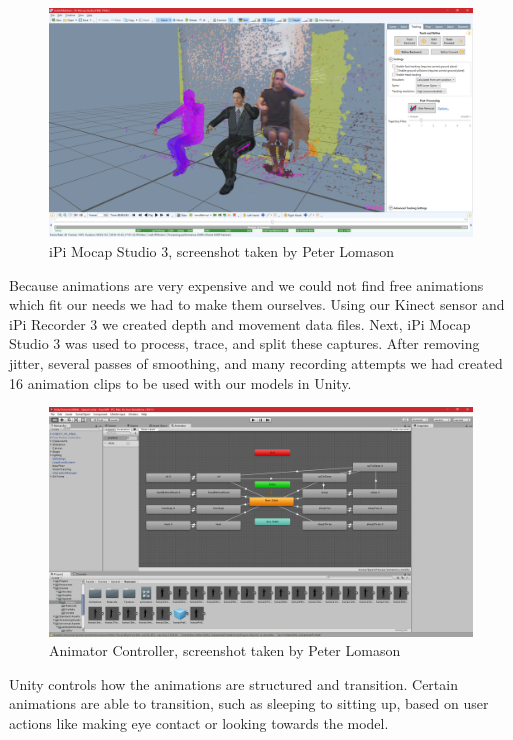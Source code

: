 \documentclass[a4paper,10pt]{article}
\begin{document}
\par
\begin{figure}[H] %
	\centerline {\includegraphics[scale = 0.28]{motionCapture.png}}
	\caption{iPi Mocap Studio 3, screenshot taken by Peter Lomason}
	\label{fig:motionCapture}
\end{figure}
Because animations are very expensive and we could not find free animations which fit our needs we had to make them ourselves. Using our Kinect sensor and iPi Recorder 3 we created depth and movement data files. Next, iPi Mocap Studio 3 was used to process, trace, and split these captures. After removing jitter, several passes of smoothing, and many recording attempts we had created 16 animation clips to be used with our models in Unity.

\par
\begin{figure}[H] %
	\centerline {\includegraphics[scale = 0.28]{animatorController.png}}
	\caption{Animator Controller, screenshot taken by Peter Lomason}
	\label{fig:animatorController}
\end{figure}
Unity controls how the animations are structured and transition. Certain animations are able to transition, such as sleeping to sitting up, based on user actions like making eye contact or looking towards the model.
\end{document}

